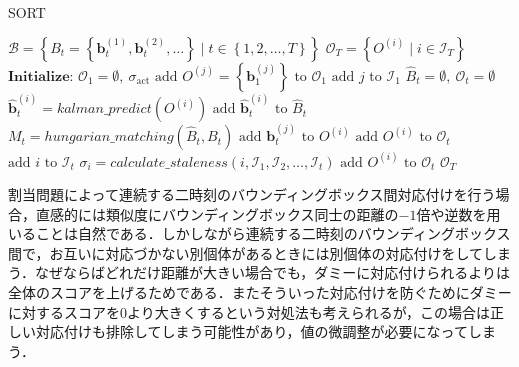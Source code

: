     \begin{algorithm}[t]
        \caption[SORT]{SORT}
        \label{alg:sort}
        \begin{algorithmic}[1]
            \Require $\mathcal{B} = \left\{B_t = \left\{\bm{b}_t^{(1)}, \bm{b}_t^{(2)}, \dots\right\} \mid t \in \left\{1, 2, \dots, T\right\}\right\}$
            \Ensure $\mathcal{O}_T = \left\{O^{(i)} \mid i \in \mathcal{I}_T\right\}$
            \State $\textbf{Initialize: } \mathcal{O}_{1} = \emptyset,\ \sigma_{\text{act}}$
                \State $\text{add } O^{(j)} = \left\{\bm{b}_1^{(j)}\right\} \text{ to } \mathcal{O}_{1}$
                \State $\text{add } j \text{ to }\mathcal{I}_1 $
            \EndFor
                \State $\hat{B}_t = \emptyset,\ \mathcal{O}_t = \emptyset$
                    \State $\hat{\bm{b}}_t^{(i)} = kalman\_predict(O^{(i)})$
                    \State $\text{add } \hat{\bm{b}}_t^{(i)} \text{ to }\hat{B}_t $
                \EndFor
                \State $M_t = hungarian\_matching(\hat{B}_t, B_t)$
                    \State $\text{add } \bm{b}_t^{(j)} \text{ to } O^{(i)}$
                    \State $\text{add } O^{(i)} \text{ to } \mathcal{O}_t$
                    \State $\text{add } i \text{ to } \mathcal{I}_t$
                \EndFor
                    \State $\sigma_i = calculate\_staleness(i, \mathcal{I}_1, \mathcal{I}_2, \dots, \mathcal{I}_t)$
                        \State $\text{add } O^{(i)} \text{ to } \mathcal{O}_t$
                    \EndIf
                \EndFor
            \EndFor
            \State \Return $\mathcal{O}_{T}$
        \end{algorithmic}
    \end{algorithm}

    割当問題によって連続する二時刻のバウンディングボックス間対応付けを行う場合，直感的には類似度にバウンディングボックス同士の距離の$-1$倍や逆数を用いることは自然である．しかしながら連続する二時刻のバウンディングボックス間で，お互いに対応づかない別個体があるときには別個体の対応付けをしてしまう．なぜならばどれだけ距離が大きい場合でも，ダミーに対応付けられるよりは全体のスコアを上げるためである．またそういった対応付けを防ぐためにダミーに対するスコアを$0$より大きくするという対処法も考えられるが，この場合は正しい対応付けも排除してしまう可能性があり，値の微調整が必要になってしまう．

